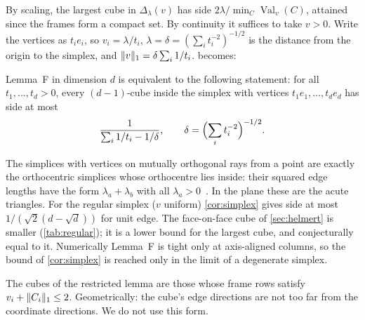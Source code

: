 \documentclass[11pt,a4paper]{article}
\newcommand{\status}[1]{\textsf{\small[#1]}}
\newcommand{\Val}{\operatorname{Val}}
\begin{document}
By scaling, the largest cube in $\Delta_\lambda(v)$ has side $2\lambda/\min_C\Val_v(C)$, attained since the frames form a compact set. By continuity it suffices to take $v>0$. Write the vertices as $t_ie_i$, so $v_i=\lambda/t_i$, $\lambda=\delta=(\sum_it_i^{-2})^{-1/2}$ is the distance from the origin to the simplex, and $\lVert v\rVert_1=\delta\sum_i1/t_i$.  becomes:

\begin{corollary}[\status{proof}]\label{cor:simplex}
Lemma~F in dimension $d$ is equivalent to the following statement: for all $t_1,\dots,t_d>0$, every $(d-1)$-cube inside the simplex with vertices $t_1e_1,\dots,t_de_d$ has side at most
\[
\frac{1}{\sum_i 1/t_i-1/\delta},\qquad \delta=\Bigl(\sum_it_i^{-2}\Bigr)^{-1/2}.
\]
\end{corollary}

The simplices with vertices on mutually orthogonal rays from a point are exactly the orthocentric simplices whose orthocentre lies inside: their squared edge lengths have the form $\lambda_a+\lambda_b$ with all $\lambda_a>0$~\cite{ehm}. In the plane these are the acute triangles. For the regular simplex ($v$ uniform) \cref{cor:simplex} gives side at most $1/(\sqrt2(d-\sqrt d))$ for unit edge. The face-on-face cube of \cref{sec:helmert} is smaller (\cref{tab:regular}); it is a lower bound for the largest cube, and conjecturally equal to it. Numerically Lemma~F is tight only at axis-aligned columns, so the bound of \cref{cor:simplex} is reached only in the limit of a degenerate simplex.

\begin{remark}
The cubes of the restricted lemma are those whose frame rows satisfy $v_i+\lVert C_i\rVert_1\le2$. Geometrically: the cube's edge directions are not too far from the coordinate directions. We do not use this form.
\end{remark}
\end{document}
